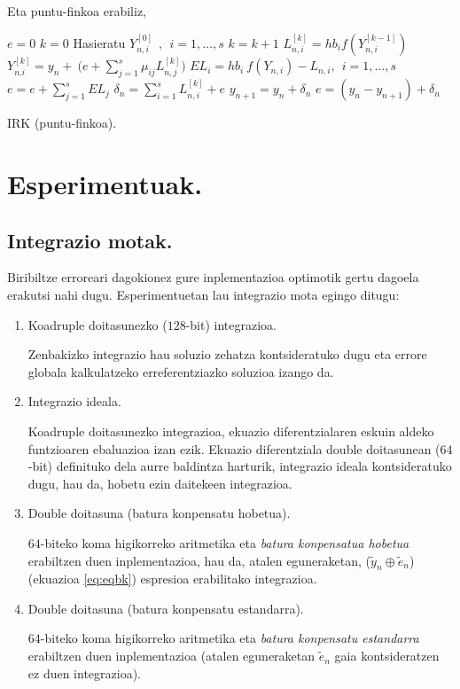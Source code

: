 Eta puntu-finkoa erabiliz,

\begin{algorithm}[h]
 \BlankLine
  $e=0$\;
  {
   \BlankLine
   $k=0$\;
   Hasieratu  $Y_{n,i}^{[0]} \ \ , \ \ i=1,\dots,s $\;
   \BlankLine
   {
    \BlankLine 
    $k=k+1$\;
    $L_{n,i}^{[k]}=hb_if(Y_{n,i}^{[k-1]}) $\;
    $Y_{n.i}^{[k]}=y_{n} + \ \big(e+\sum\limits_{j=1}^{s} \mu_{ij} L_{n,j}^{[k]}\big)  $\;  
   }
   \BlankLine
    $EL_{i}=hb_i \ f(Y_{n,i})-L_{n,i}, \ \ i=1,\dots,s$\;
    $e=e+\sum\limits_{j=1}^{s}EL_{j}$\;
    $\delta_{n}= \sum\limits_{i=1}^{s} L_{n,i}^{[k]}+e $\;
    $y_{n+1}=y_{n}+ \delta_{n} $\;
    $e=(y_{n}-y_{n+1})+\delta_n$\;
   \BlankLine
 }
 \caption{IRK (puntu-finkoa).}
\end{algorithm}


\section{Esperimentuak.}


\subsection{Integrazio motak.}

Biribiltze erroreari dagokionez gure inplementazioa optimotik gertu dagoela erakutsi nahi dugu. Esperimentuetan lau integrazio mota egingo ditugu:

\begin{enumerate}

\item Koadruple doitasunezko ($128$-bit) integrazioa.

Zenbakizko integrazio hau soluzio zehatza kontsideratuko dugu eta errore globala kalkulatzeko erreferentziazko soluzioa izango da.

\item Integrazio ideala.

Koadruple doitasunezko integrazioa, ekuazio diferentzialaren eskuin aldeko funtzioaren ebaluazioa izan ezik. 
Ekuazio diferentziala double doitasunean ($64$-bit) definituko dela aurre baldintza harturik, integrazio ideala kontsideratuko dugu, hau da, hobetu ezin daitekeen integrazioa.    

\item Double doitasuna (batura konpensatu hobetua).

$64$-biteko koma higikorreko aritmetika eta \emph{batura konpensatua hobetua} erabiltzen duen inplementazioa, hau da,
atalen eguneraketan, ($\tilde{y}_n \oplus \tilde{e}_n$) (ekuazioa \ref{eq:eqbk}) espresioa erabilitako integrazioa.

\item Double doitasuna (batura konpensatu estandarra).

$64$-biteko koma higikorreko aritmetika eta \emph{batura konpensatu estandarra} erabiltzen duen inplementazioa (atalen eguneraketan $\tilde{e}_n$ gaia kontsideratzen ez duen integrazioa). 

\end{enumerate}

